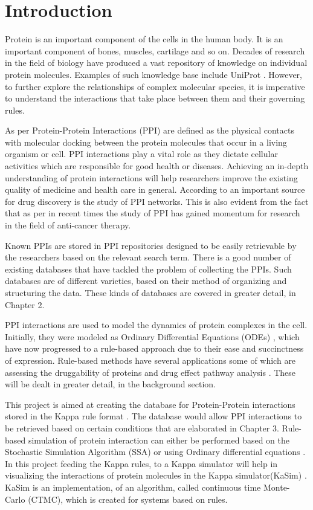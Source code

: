 \documentclass[msc,deptreport,ai]{infthesis}      %
\begin{document}
\chapter{Introduction}
Protein is an important component of the cells in the human body. It is an important component of bones, muscles, cartilage and so on. Decades of research in the field of biology have produced a vast repository of knowledge on individual protein molecules. Examples of such knowledge base include UniProt \cite{uniprot}. However, to further explore the relationships of complex molecular species, it is imperative to understand the interactions that take place between them and their governing rules.

As per \cite{ppiDef} Protein-Protein Interactions (PPI) are defined as the physical contacts with molecular docking between the protein molecules that occur in a living organism or cell. PPI interactions play a vital role as they dictate cellular activities which are responsible for good health or diseases. Achieving an in-depth understanding of protein interactions will help researchers improve the existing quality of medicine and health care in general. According to \cite{ppimp} an important source for drug discovery is the study of PPI networks. This is also evident from the fact that as per \cite{cancer} in recent times the study of PPI has gained momentum for research in the field of anti-cancer therapy. 

Known PPIs are stored in PPI repositories designed to be easily retrievable by the researchers based on the relevant search term. There is a good number of existing databases that have tackled the problem of collecting the PPIs. Such databases are of different varieties, based on their method of organizing and structuring the data. These kinds of databases are covered in greater detail, in Chapter 2. 

PPI interactions are used to model the dynamics of protein complexes in the cell. Initially, they were modeled as Ordinary Differential Equations (ODEs) \cite{ode}, which have now progressed to a rule-based approach due to their ease and succinctness of expression. Rule-based methods have several applications some of which are assessing the druggability of proteins \cite{proteinDruggability} and drug effect pathway analysis \cite{pathwayAnalysis}. These will be dealt in greater detail, in the background section. 

This project is aimed at creating the database for Protein-Protein interactions stored in the Kappa rule format \cite{kappa}. The database would allow PPI interactions to be retrieved based on certain conditions that are elaborated in Chapter 3. Rule-based simulation of protein interaction can either be performed based on the Stochastic Simulation Algorithm (SSA) or using Ordinary differential equations \cite{chylek2014rule}. In this project feeding the Kappa rules, to a Kappa simulator will help in visualizing the interactions of protein molecules in the Kappa simulator(KaSim) \cite{kasim}. KaSim is an implementation, of an algorithm, called continuous time Monte-Carlo (CTMC), which is created for systems based on rules. 
\end{document}

